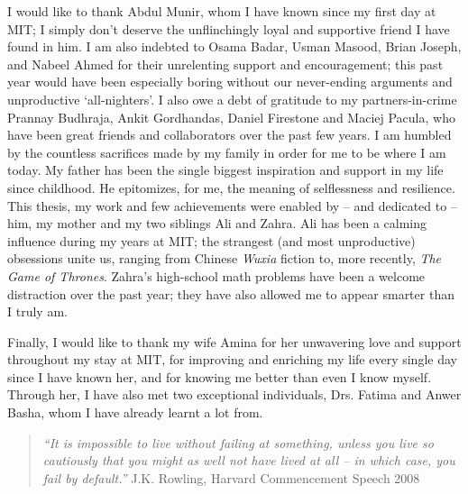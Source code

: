 I would like to thank Abdul Munir, whom I have known since my first day at MIT; 
I simply don't deserve the unflinchingly loyal and supportive friend I have found in him. 
I am also indebted to Osama Badar, Usman Masood, Brian Joseph, and Nabeel Ahmed
for their unrelenting support and encouragement; this past year would have been especially 
boring without our never-ending arguments and unproductive `all-nighters'.
I also owe a debt of gratitude to my partners-in-crime Prannay Budhraja, Ankit Gordhandas, Daniel Firestone 
and Maciej Pacula, who have been great friends and collaborators over the past few years. 
\newpage
I am humbled by the countless sacrifices made by my family in order for me to be where I am today. 
My father has been the single biggest inspiration and support in my life since childhood.
He epitomizes, for me, the meaning of selflessness and resilience.
This thesis, my work and few achievements were enabled by -- and dedicated to -- him, my mother and my two siblings Ali and Zahra. Ali has been a calming influence during my years at MIT; the strangest
(and most unproductive) obsessions unite us, ranging from Chinese \emph{Wuxia} fiction to,
more recently, \emph{The Game of Thrones}. Zahra's high-school math problems
have been a welcome distraction over the past year; they have also allowed me to appear
smarter than I truly am.

Finally, I would like to thank my wife Amina for her unwavering love and support throughout my stay at MIT, 
for improving and enriching my life every single day since I have known her, and for
knowing me better than even I know myself. 
Through her, I have also met two exceptional individuals, Drs. Fatima and Anwer Basha,
  whom I have already learnt a lot from.  \newline 

\begin{quote}
\emph{``It is impossible to live without failing at something, unless you live so cautiously that you might as well not have
lived at all -- in which case, you fail by default.''} \newline
J.K. Rowling, Harvard Commencement Speech 2008
\end{quote}

